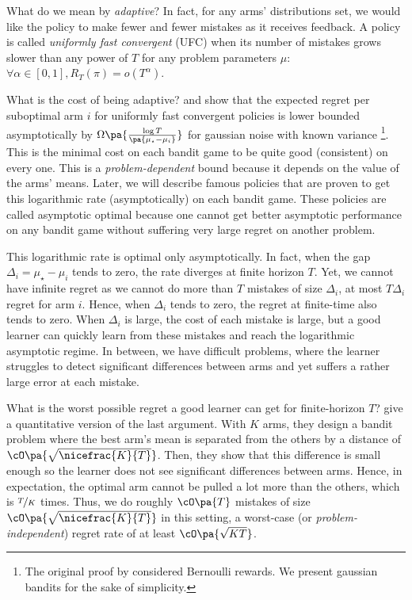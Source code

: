 {What do we mean by \emph{adaptive}? In fact, for any arms' distributions set, we would like the policy to make fewer and fewer mistakes as it receives feedback. A policy is called \emph{uniformly fast convergent} (UFC) when its number of mistakes grows slower than any power of $T$ for any problem parameters $\mu$: $\forall \alpha \in\left[0,1\right], R_T(\pi) = o(T^\alpha)$. %

What is the cost of being adaptive? \citet{lai1985asymptotically} and \citet{burnetas1996optimal} show that the expected regret per suboptimal arm $i$ for uniformly fast convergent policies is lower bounded asymptotically by $\Omega\pa{\frac{\log{T}}{\pa{\mu_\star -\mu_i}}}$ for gaussian noise with known variance \footnote{The original proof by \citet{lai1985asymptotically} considered Bernoulli rewards. We present gaussian bandits for the sake of simplicity.}. This is the minimal cost on each bandit game to be quite good (\ie consistent) on every one. This is a \emph{problem-dependent} bound because it depends on the value of the arms' means. Later, we will describe famous policies that are proven to get this logarithmic rate (asymptotically) on each bandit game. These policies are called asymptotic optimal because one cannot get better asymptotic performance on any bandit game without suffering very large regret on another problem. 

This logarithmic rate is optimal only asymptotically. In fact, when the gap $\Delta_i = \mu_\star -\mu_i$ tends to zero, the rate diverges at finite horizon $T$. Yet, we cannot have infinite regret as we cannot do more than $T$ mistakes of size $\Delta_i$, \ie at most $T\Delta_i$ regret for arm $i$. Hence, when $\Delta_i$ tends to zero, the regret at finite-time also tends to zero. When $\Delta_i$ is large, the cost of each mistake is large, but a good learner can quickly learn from these mistakes and reach the logarithmic asymptotic regime. In between, we have difficult problems, where the learner struggles to detect significant differences between arms and yet suffers a rather large error at each mistake. 

What is the worst possible regret a good learner can get for finite-horizon $T$?  \citet{auer2002nonstochastic} give a quantitative version of the last argument. With $K$ arms, they design a bandit problem where the best arm's mean is separated from the others by a distance of $\cO\pa{\sqrt{\nicefrac{K}{T}}}$. Then, they show that this difference is small enough so the learner does not see significant differences between arms. Hence, in expectation, the optimal arm cannot be pulled a lot more than the others, which is $\nicefrac{T}{K}$ times. Thus, we do roughly $\cO\pa{T}$ mistakes of size $\cO\pa{\sqrt{\nicefrac{K}{T}}}$ in this setting, \ie a worst-case (or \emph{problem-independent}) regret rate of at least $\cO\pa{\sqrt{KT}}$. 

}
